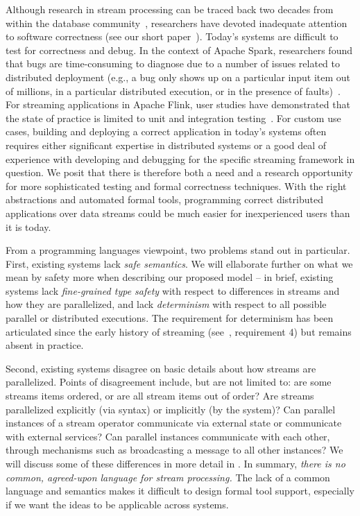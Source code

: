 Although research in stream processing can be traced back two decades from within the database community~\cite{Aurora,Borealis,STREAM2004,Telegraph,ABW2006CQL},
researchers have devoted inadequate attention to software correctness (see our short paper~).
Today's systems are difficult to test for correctness and debug. In the context of Apache Spark, researchers found that bugs are time-consuming to diagnose due to a number of issues related to distributed deployment (e.g., a bug only shows up on a particular input item out of millions, in a particular distributed execution, or in the presence of faults)~\cite{gulzar2016bigdebug}. For streaming applications in Apache Flink, user studies have demonstrated that the state of practice is limited to unit and integration testing~\cite{vianna2019exploratory}.
For custom use cases, building and deploying a correct application in today's systems often requires either significant expertise in distributed systems or a good deal of experience with developing and debugging for the specific streaming framework in question. We posit that there is therefore both a need and a research opportunity for more sophisticated testing and formal correctness techniques. With the right abstractions and automated formal tools, programming correct distributed applications over data streams could be much easier for inexperienced users than it is today.

From a programming languages viewpoint, two problems stand out in particular. First, existing systems lack \emph{safe semantics}. We will ellaborate further on what we mean by safety more when describing our proposed model -- in brief, existing systems lack \emph{fine-grained type safety} with respect to differences in streams and how they are parallelized, and lack \emph{determinism} with respect to all possible parallel or distributed executions. The requirement for determinism has been articulated since the early history of streaming (see~\cite{stonebraker20058}, requirement 4) but remains absent in practice.

Second, existing systems disagree on basic details about how streams are parallelized. Points of disagreement include, but are not limited to: are some streams items ordered, or are all stream items out of order? Are streams parallelized explicitly (via syntax) or implicitly (by the system)? Can parallel instances of a stream operator communicate via external state or communicate with external services? Can parallel instances communicate with each other, through mechanisms such as broadcasting a message to all other instances? We will discuss some of these differences in more detail in . In summary, \emph{there is no common, agreed-upon language for stream processing.} The lack of a common language and semantics makes it difficult to design formal tool support, especially if we want the ideas to be applicable across systems.

